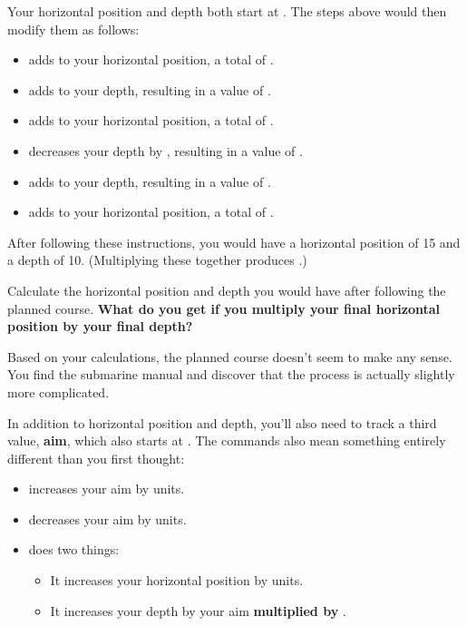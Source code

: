 Your horizontal position and depth both start at . The steps above would then modify them as follows:
\begin{itemize}
  \item {\Tt{}\nwendquote} adds  to your horizontal position, a total of .
  \item {\Tt{}\nwendquote} adds  to your depth, resulting in a value of .
  \item {\Tt{}\nwendquote} adds  to your horizontal position, a total of .
  \item {\Tt{}\nwendquote} decreases your depth by , resulting in a value of .
  \item {\Tt{}\nwendquote} adds  to your depth, resulting in a value of .
  \item {\Tt{}\nwendquote} adds  to your horizontal position, a total of .
\end{itemize}

After following these instructions, you would have a horizontal position of 15 and a depth of 10. (Multiplying these together produces .)

Calculate the horizontal position and depth you would have after following the planned course. \textbf{What do you get if you multiply your final horizontal position by your final depth?}


Based on your calculations, the planned course doesn't seem to make any sense. You find the submarine manual and discover that the process is actually slightly more complicated.

In addition to horizontal position and depth, you'll also need to track a third value, \textbf{aim}, which also starts at . The commands also mean something entirely different than you first thought:

\begin{itemize}
\item {\Tt{}\nwendquote} increases your aim by  units.
\item {\Tt{}\nwendquote} decreases your aim by  units.
\item {\Tt{}\nwendquote} does two things:
  \begin{itemize}
  \item It increases your horizontal position by  units.
  \item It increases your depth by your aim \textbf{multiplied by} .
  \end{itemize}
\end{itemize}

